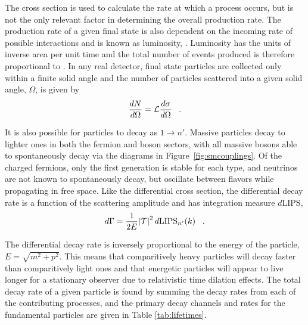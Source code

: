  The cross section is used to calculate the rate
  at which a process occurs, but is
  not the only relevant factor in determining
  the overall production rate.
 The production rate of a given final state
  is also dependent on the incoming
  rate of possible interactions and is 
  known as luminosity, \lumi.
 Luminosity has the units of inverse area per unit time
  and the total number of events produced
  is therefore proportional to \tlumi.
 In any real detector, final state particles
  are collected only within a finite
  solid angle and the number of particles
  scattered into a given solid angle, $\Omega$, is given by
\begin{equation}
 \frac{dN}{d\Omega} = \mathcal L \frac{d\sigma}{d\Omega}\;\;\;.
\end{equation}



 It is also possible for particles to decay
  as $1\rightarrow n'$.
 Massive particles decay to lighter ones
  in both the fermion and boson sectors,
  with all massive bosons able to 
  spontaneously decay via the diagrams in
  Figure~\ref{fig:smcouplings}.
 Of the charged fermions, only the first
  generation is stable for each type, and
  neutrinos are not known to spontaneously
  decay, but oscillate between flavors
  while propagating in free space.
 Like the differential cross section,
  the differential decay rate is a function
  of the scattering amplitude and
  has integration measure $d\mathrm{LIPS}$, 
\begin{equation}\label{eq:diffdecayrate}
 d\Gamma = \frac{1}{2E}\abs{\mathcal{T}}^2d\mathrm{LIPS}_{n'}(k)\;\;\;.
\end{equation}

 The differential decay rate is 
  inversely proportional to the energy
  of the particle, $E=\sqrt{m^2 + p^2}$.
 This means that
  comparitively heavy particles will decay
  faster than comparitively light ones
  and that energetic particles
  will appear to live longer 
  for a stationary observer due to
  relativistic time dilation effects.
 The total decay rate of a given particle
  is found by summing the decay rates from
  each of the contributing processes,
  and the primary decay channels and rates
  for the fundamental particles
  are given in Table \ref{tab:lifetimes}.

